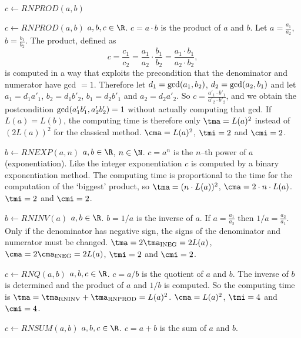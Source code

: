 \begin{deflist}{$c \gets RNPROD(a,b)$}
\item[$c \gets RNPROD(a,b)$] $a, b, c \in \R$.
     $c = a \cdot b$ is the product of $a$ and $b$.
     Let $a = \frac{a_1}{a_2}$, $b = \frac{b_1}{b_2}$.
     The product, defined as 
     \begin{displaymath}
     c = \frac{c_1}{c_2} =
     \frac{a_1}{a_2} \cdot \frac{b_1}{b_2} =
     \frac{a_1 \cdot b_1}{a_2 \cdot b_2},
     \end{displaymath}
     is computed in a way that exploits the precondition
     that the denominator and numerator have gcd $=1$.
     Therefore let $d_1 = {\rm gcd}(a_1,b_2)$, 
     $d_2 = {\rm gcd}(a_2,b_1)$ and 
     let $a_1 = d_1 a'_1$, $b_2 = d_1 b'_2$,
     $b_1 = d_2 b'_1$ and $a_2 = d_2 a'_2$. 
     So  
     $\displaystyle c = \frac{a'_1 \cdot b'_1}{a'_2 \cdot b'_2}$,
     and we obtain the postcondition
     ${\rm gcd}(a'_1 b'_1, a'_2 b'_2) = 1$ without 
     actually computing that gcd.
     If $L(a) = L(b)$,
     the computing time is therefore only 
     $\tma = L(a)^2$ instead of $(2L(a))^2$ for the classical method.
     $\cma = L(a)^2$, $\tmi = 2$ and $\cmi = 2$.
\item[$b \gets RNEXP(a,n)$] $a, b \in \R$, $n \in \N$.
     $c = a^n$ is the $n$--th power of $a$ (exponentiation).
     Like the integer exponentiation
     $c$ is computed by a binary exponentiation method.
     The computing time is proportional to 
     the time for the computation of the `biggest' product, so  
     $\tma = (n \cdot L(a))^2$, $\cma = 2 \cdot n \cdot L(a)$. 
     $\tmi = 2$ and $\cmi = 2$.
\item[$b \gets RNINV(a)$] $a, b \in \R$.
     $b = 1 / a$ is the inverse of $a$. 
     If $a = \frac{a_1}{a_2}$ then $1/a = \frac{a_2}{a_1}$.
     Only if the denominator has negative sign, the 
     signs of the denominator and numerator must be changed.     
     $\tma = 2 \tma_{{\rm INEG}} = 2 L(a)$, 
     $\cma = 2 \cma_{{\rm INEG}} = 2 L(a)$, 
     $\tmi = 2$ and $\cmi = 2$. 
\item[$c \gets RNQ(a,b)$] $a, b, c \in \R$.
     $c = a / b$ is the quotient of $a$ and $b$.
     The inverse of $b$ is determined and the product 
     of $a$ and $1/b$ is computed.     
     So the computing time is
     $\tma = \tma_{{\rm RNINV}} + \tma_{{\rm RNPROD}} = L(a)^2$. 
     $\cma = L(a)^2$, $\tmi = 4$ and $\cmi = 4$. 
\item[$c \gets RNSUM(a,b)$] $a, b, c \in \R$.
     $c = a + b$ is the sum of $a$ and $b$. 

\end{deflist}
